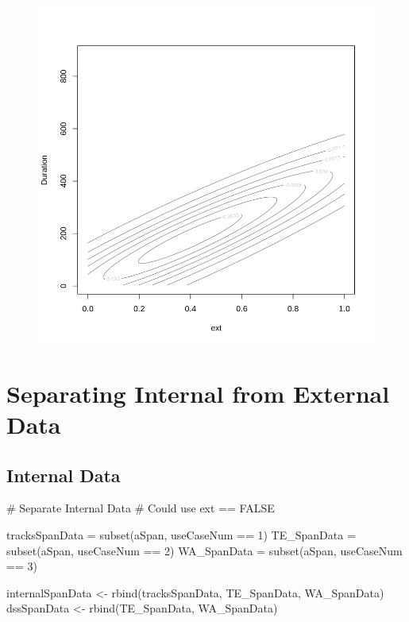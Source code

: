 \documentclass[
  letterpaper,
  DIV=11,
  numbers=noendperiod]{scrartcl}
\newenvironment{Shaded}{\begin{snugshade}}{\end{snugshade}}
\newcommand{\CommentTok}[1]{\textcolor[rgb]{0.37,0.37,0.37}{#1}}
\newcommand{\DecValTok}[1]{\textcolor[rgb]{0.68,0.00,0.00}{#1}}
\newcommand{\FunctionTok}[1]{\textcolor[rgb]{0.28,0.35,0.67}{#1}}
\newcommand{\NormalTok}[1]{\textcolor[rgb]{0.00,0.23,0.31}{#1}}
\newcommand{\OtherTok}[1]{\textcolor[rgb]{0.00,0.23,0.31}{#1}}
\newcommand{\SpecialCharTok}[1]{\textcolor[rgb]{0.37,0.37,0.37}{#1}}
\begin{document}
\begin{figure}[H]

{\centering \includegraphics{dss-span-analysis-rev5_files/figure-pdf/cell-51-output-1.png}

}

\end{figure}

\hypertarget{separating-internal-from-external-data}{%
\section{Separating Internal from External
Data}\label{separating-internal-from-external-data}}

\hypertarget{internal-data}{%
\subsection{Internal Data}\label{internal-data}}

\begin{Shaded}
\begin{Highlighting}[]
\CommentTok{\# Separate Internal Data}
\CommentTok{\# Could use ext == FALSE}

\NormalTok{tracksSpanData }\OtherTok{=} \FunctionTok{subset}\NormalTok{(aSpan, useCaseNum }\SpecialCharTok{==} \DecValTok{1}\NormalTok{)}
\NormalTok{TE\_SpanData }\OtherTok{=} \FunctionTok{subset}\NormalTok{(aSpan, useCaseNum }\SpecialCharTok{==} \DecValTok{2}\NormalTok{)}
\NormalTok{WA\_SpanData }\OtherTok{=} \FunctionTok{subset}\NormalTok{(aSpan, useCaseNum }\SpecialCharTok{==} \DecValTok{3}\NormalTok{)}

\NormalTok{internalSpanData }\OtherTok{\textless{}{-}} \FunctionTok{rbind}\NormalTok{(tracksSpanData, TE\_SpanData, WA\_SpanData)}
\NormalTok{dssSpanData }\OtherTok{\textless{}{-}} \FunctionTok{rbind}\NormalTok{(TE\_SpanData, WA\_SpanData)}
\end{Highlighting}
\end{Shaded}
\end{document}
